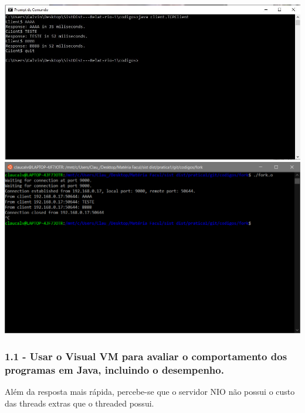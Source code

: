 \vspace{2em}
\begin{minipage}{\textwidth}
    \hspace{-1em}
    \centering
    \includegraphics[trim= 0 200 250 0, clip, scale=.4] {prints/terminal-cilente-fork.JPG}
    \includegraphics[trim= 0 200 0 0, clip, scale=.4] {prints/terminal-server-fork.PNG}
    \label{threadspng}
    \hspace{1em}
\end{minipage}
\vspace{0.5em}

\pagebreak

\subsubsection{1.1 - Usar o Visual VM para avaliar o comportamento dos programas em Java, incluindo o desempenho.}

Além da resposta mais rápida, percebe-se que o servidor NIO não possui o custo das threads extras que o threaded possui.

